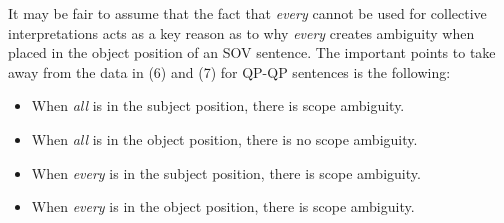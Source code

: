 \documentclass[english, 11pt]{article}
\begin{document}
\newline
It may be fair to assume that the fact that \emph{every} cannot be used for collective interpretations acts as a key reason as to why \emph{every} creates ambiguity when placed in the object position of an SOV sentence. The important points to take away from the data in (6) and (7) for QP-QP sentences is the following:
\begin{itemize}
	\item When \emph{all} is in the subject position, there is scope ambiguity.
	\item When \emph{all} is in the object position, there is no scope ambiguity.
	\item When \emph{every} is in the subject position, there is scope ambiguity.
	\item When \emph{every} is in the object position, there is scope ambiguity.
\end{itemize}
\end{document}
